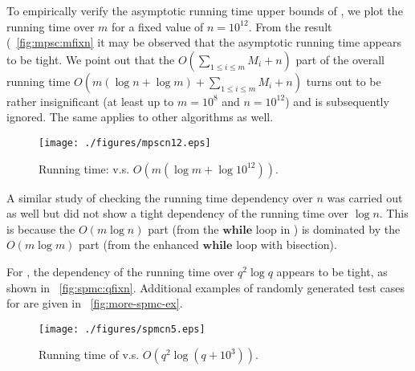 To empirically verify the asymptotic running time upper bounds of 
\algoMRSimple, we plot the running time over $m$ for a fixed value of 
$n =10^{12}$. From the result (~\ref{fig:mpsc:mfixn} it may be 
observed that the asymptotic running time appears to be tight. We point
out that the $O(\sum_{1\le i \le m} M_i + n)$ part of the overall 
running time $O(m(\log n + \log m) + \sum_{1\le i \le m} M_i + n)$ turns 
out to be rather insignificant (at least up to $m = 10^8$ and $n = 10^12$) 
and is subsequently ignored. The same applies to other algorithms as 
well. 
\begin{figure}[ht!]
    \vspace*{-2mm}
    \centering
    \texttt{[image: ./figures/mpscn12.eps]}
    \vspace*{-4mm}
    \caption{\label{fig:opg-mpsc:mfixn}Running time: \algoMRSimple 
		v.s. $O(m (\log m + \log 10^{12}))$.}
    \vspace*{-3mm}
\end{figure}

A similar study of checking the running time dependency over $n$ was 
carried out as well but did not show a tight dependency of the running 
time over $\log n$. This is because the $O(m\log n)$ part (from the 
$\mathbf{while}$ loop in \algoMRSimple) is dominated by the 
$O(m\log m)$ part (from the enhanced $\mathbf{while}$ loop with bisection). 

For \algoSRG, the dependency of the running time over $q^2\log q$ 
appears to be tight, as shown in ~\ref{fig:spmc:qfixn}. Additional 
examples of randomly generated test cases for \algoSRG are 
given in ~\ref{fig:more-spmc-ex}. 
\begin{figure}[ht!]
    \centering
    \texttt{[image: ./figures/spmcn5.eps]}
    \vspace*{-4mm}
    \caption{\label{fig:opg-spmc:qfixn}Running time of \algoSRG 
		v.s. $O(q^2\log(q + 10^3))$.}
    \vspace*{-2mm}
\end{figure}

